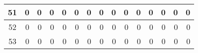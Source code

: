 \begin{table}[hb!]
\begin{adjustbox}{width = \textwidth, center}
\begin{tabular}{|c|r|r|r|r|r|r|r|r|r|r|r|r|r|r|}
        \rowcolor[HTML]{FFFFFF} 
        \cellcolor[HTML]{CFE2F3}51                                  & 0                                              & 0                                              & 0                                              & 0                                              & 0                                              & 0                                              & 0                                              & 0                                               & 0                                               & 0                                               & 0                                               & 0                                               & \cellcolor[HTML]{D9D2E9}0                                                       & \cellcolor[HTML]{D9D2E9}0                                                             \\ \hline
        \rowcolor[HTML]{FFFFFF} 
        \cellcolor[HTML]{CFE2F3}52                                  & 0                                              & 0                                              & 0                                              & 0                                              & 0                                              & 0                                              & 0                                              & 0                                               & 0                                               & 0                                               & 0                                               & 0                                               & \cellcolor[HTML]{D9D2E9}0                                                       & \cellcolor[HTML]{D9D2E9}0                                                             \\ \hline
        \rowcolor[HTML]{FFFFFF} 
        \cellcolor[HTML]{CFE2F3}53                                  & 0                                              & 0                                              & 0                                              & 0                                              & 0                                              & 0                                              & 0                                              & 0                                               & 0                                               & 0                                               & 0                                               & 0                                               & \cellcolor[HTML]{D9D2E9}0                                                       & \cellcolor[HTML]{D9D2E9}0                                                             \\ \hline

\end{tabular}
\end{adjustbox}
\end{table}
